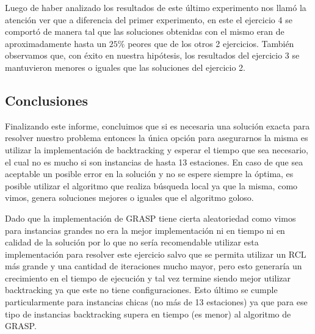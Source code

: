         Luego de haber analizado los resultados de este último experimento nos llamó la atención ver que a diferencia del primer experimento, en este el ejercicio 4 se comportó de manera tal que las soluciones obtenidas con el mismo eran de aproximadamente hasta un $25\%$ peores que de los otros 2 ejercicios. También observamos que, con éxito en nuestra hipótesis, los resultados del ejercicio 3 se mantuvieron menores o iguales que las soluciones del ejercicio 2.

    \subsection{Conclusiones}
        Finalizando este informe, concluimos que si es necesaria una solución exacta para resolver nuestro problema entonces la única opción para asegurarnos la misma es utilizar la implementación de backtracking y esperar el tiempo que sea necesario, el cual no es mucho si son instancias de hasta 13 estaciones. En caso de que sea aceptable un posible error en la solución y no se espere siempre la óptima, es posible utilizar el algoritmo que realiza búsqueda local ya que la misma, como vimos, genera soluciones mejores o iguales que el algoritmo goloso.

        Dado que la implementación de GRASP tiene cierta aleatoriedad como vimos para instancias grandes no era la mejor implementación ni en tiempo ni en calidad de la solución por lo que no sería recomendable utilizar esta implementación para resolver este ejercicio salvo que se permita utilizar un RCL más grande y una cantidad de iteraciones mucho mayor, pero esto generaría un crecimiento en el tiempo de ejecución y tal vez termine siendo mejor utilizar backtracking ya que este no tiene configuraciones. Esto último se cumple particularmente para instancias chicas (no más de 13 estaciones) ya que para ese tipo de instancias backtracking supera en tiempo (es menor) al algoritmo de GRASP.
